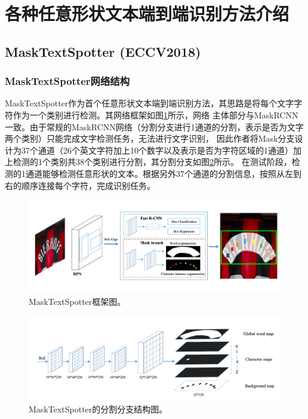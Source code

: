 \section{各种任意形状文本端到端识别方法介绍}
\subsection{MaskTextSpotter (ECCV2018)}
\subsubsection{MaskTextSpotter网络结构}
MaskTextSpotter作为首个任意形状文本端到端识别方法，其思路是将每个文字字符作为一个类别进行检测。其网络框架如图\ref{masktextspotter_framework}所示，网络
主体部分与MaskRCNN\cite{he2017mask}一致。由于常规的MaskRCNN网络（分割分支进行1通道的分割，表示是否为文字两个类别）只能完成文字检测任务，无法进行文字识别，
因此作者将Mask分支设计为37个通道（26个英文字符加上10个数字以及表示是否为字符区域的1通道）加上检测的1个类别共38个类别进行分割，其分割分支如图\ref{masktextspotter_maskbranch}所示。
在测试阶段，检测的1通道能够检测任意形状的文本。根据另外37个通道的分割信息，按照从左到右的顺序连接每个字符，完成识别任务。

\begin{figure}[htb]
    \centering
    \includegraphics[width=.98\textwidth]{figure/spotting/masktextspotter_framework.png} 
    \caption{MaskTextSpotter框架图。} 
    \label{masktextspotter_framework} 
\end{figure}

\begin{figure}[htb]
    \centering
    \includegraphics[width=.98\textwidth]{figure/spotting/masktextspotter_maskbranch.png} 
    \caption{MaskTextSpotter的分割分支结构图。} 
    \label{masktextspotter_maskbranch} 
\end{figure}

